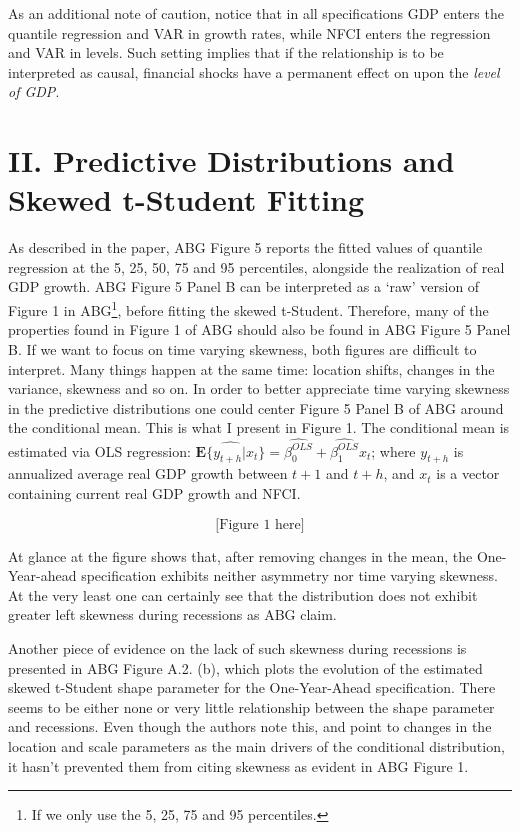 \documentclass[12pt,]{article}
\let\rmarkdownfootnote\footnote%
\def\footnote{\protect\rmarkdownfootnote}
\begin{document}
As an additional note of caution, notice that in all specifications GDP
enters the quantile regression and VAR in growth rates, while NFCI
enters the regression and VAR in levels. Such setting implies that if
the relationship is to be interpreted as causal, financial shocks have a
permanent effect on upon the \textit{level of GDP}.

\hypertarget{ii.-predictive-distributions-and-skewed-t-student-fitting}{%
\section{II. Predictive Distributions and Skewed t-Student
Fitting}\label{ii.-predictive-distributions-and-skewed-t-student-fitting}}

As described in the paper, ABG Figure 5 reports the fitted values of
quantile regression at the 5, 25, 50, 75 and 95 percentiles, alongside
the realization of real GDP growth. ABG Figure 5 Panel B can be
interpreted as a `raw' version of Figure 1 in
ABG\footnote{If we only use the 5, 25, 75 and 95 percentiles.}, before
fitting the skewed t-Student. Therefore, many of the properties found in
Figure 1 of ABG should also be found in ABG Figure 5 Panel B. If we want
to focus on time varying skewness, both figures are difficult to
interpret. Many things happen at the same time: location shifts, changes
in the variance, skewness and so on. In order to better appreciate time
varying skewness in the predictive distributions one could center Figure
5 Panel B of ABG around the conditional mean. This is what I present in
Figure 1. The conditional mean is estimated via OLS regression:
\(\widehat{\mathbf{E}\{y_{t+h} | x_t \}} = \widehat{\beta_0^{OLS}} + \widehat{\beta_1^{OLS}}x_t\);
where \(y_{t+h}\) is annualized average real GDP growth between \(t+1\)
and \(t+h\), and \(x_t\) is a vector containing current real GDP growth
and NFCI.

\[
\text{[Figure 1 here]}
\]

At glance at the figure shows that, after removing changes in the mean,
the One-Year-ahead specification exhibits neither asymmetry nor time
varying skewness. At the very least one can certainly see that the
distribution does not exhibit greater left skewness during recessions as
ABG claim.

Another piece of evidence on the lack of such skewness during recessions
is presented in ABG Figure A.2. (b), which plots the evolution of the
estimated skewed t-Student shape parameter for the One-Year-Ahead
specification. There seems to be either none or very little relationship
between the shape parameter and recessions. Even though the authors note
this, and point to changes in the location and scale parameters as the
main drivers of the conditional distribution, it hasn't prevented them
from citing skewness as evident in ABG Figure 1.
\end{document}
